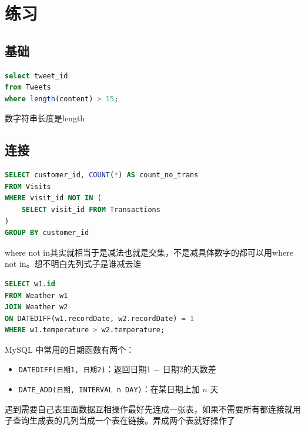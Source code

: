 \chapter{练习}

\section{基础}
\begin{homework}[1683 | 查询 第5题]
\begin{lstlisting}[language=SQL]
 select tweet_id
from Tweets
where length(content) > 15;
\end{lstlisting}
数字符串长度是length
\end{homework}

\section{连接}
\begin{homework}[1581 | 连接 第3题]
\begin{lstlisting}[language=SQL]
SELECT customer_id, COUNT(*) AS count_no_trans
FROM Visits
WHERE visit_id NOT IN (
    SELECT visit_id FROM Transactions
)
GROUP BY customer_id
\end{lstlisting}
\begin{dxtips}
    where not in其实就相当于是减法也就是交集，不是减具体数字的都可以用where not in。想不明白先列式子是谁减去谁
\end{dxtips}
\end{homework}

\begin{homework}[197 | 连接 第4题]
\begin{lstlisting}[language=SQL]
SELECT w1.id
FROM Weather w1
JOIN Weather w2
ON DATEDIFF(w1.recordDate, w2.recordDate) = 1
WHERE w1.temperature > w2.temperature;
\end{lstlisting}
\begin{dxtips}[日期题]
    MySQL 中常用的日期函数有两个：
\begin{itemize}
    \item \texttt{DATEDIFF(日期1, 日期2)}：返回日期1 $-$ 日期2的天数差
    \item \texttt{DATE\_ADD(日期, INTERVAL n DAY)}：在某日期上加 $n$ 天
\end{itemize}
\end{dxtips}
\begin{dxtips}
    遇到需要自己表里面数据互相操作最好先连成一张表，如果不需要所有都连接就用子查询生成表的几列当成一个表在链接。弄成两个表就好操作了
\end{dxtips}
\end{homework}

